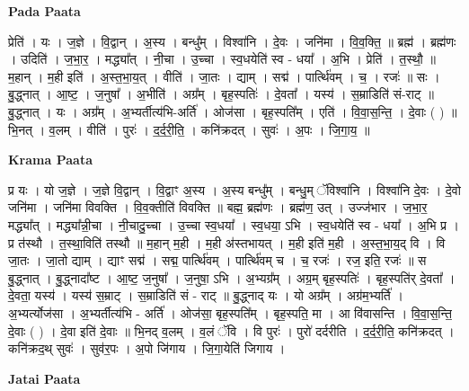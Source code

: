 \documentclass[17pt]{extarticle}
\begin{document}
\textbf{Pada Paata} \newline

प्रेति॑ । यः । ज॒ज्ञे । वि॒द्वान् । अ॒स्य । बन्धु᳚म् । विश्वा॑नि । दे॒वः । जनि॑मा । वि॒व॒क्ति॒ ॥ ब्रह्म॑ । ब्रह्म॑णः । उदिति॑ । ज॒भा॒र॒ । मद्ध्या᳚त् । नी॒चा । उ॒च्चा । स्व॒धयेति॑ स्व - धया᳚ । अ॒भि । प्रेति॑ । त॒स्थौ॒ ॥ म॒हान् । म॒ही इति॑ । अ॒स्त॒भा॒य॒त् । वीति॑ । जा॒तः । द्याम् । सद्म॑ । पार्त्थि॑वम् । च॒ । रजः॑ ॥ सः । बु॒द्ध्नात् । आ॒ष्ट॒ । ज॒नुषा᳚ । अ॒भीति॑ । अग्र᳚म् । बृह॒स्पतिः॑ । दे॒वता᳚ । यस्य॑ । स॒म्राडिति॑ सं-राट् ॥ बु॒द्ध्नात् । यः । अग्र᳚म् । अ॒भ्यर्तीत्य॑भि-अर्ति॑ । ओज॑सा । बृह॒स्पति᳚म् । एति॑ । वि॒वा॒स॒न्ति॒ । दे॒वाः ( ) ॥ भि॒नत् । व॒लम् । वीति॑ । पुरः॑ । द॒र्द॒री॒ति॒ । कनि॑क्रदत् । सुवः॑ । अ॒पः । जि॒गा॒य॒ ॥  \newline


\textbf{Krama Paata} \newline

प्र यः । यो ज॒ज्ञे । ज॒ज्ञे वि॒द्वान् । वि॒द्वाꣳ अ॒स्य । अ॒स्य बन्धु᳚म् । बन्धु॒म् ॅविश्वा॑नि । विश्वा॑नि दे॒वः । दे॒वो जनि॑मा । जनि॑मा विवक्ति । वि॒व॒क्तीति॑ विवक्ति ॥ बह्म॒ ब्रह्म॑णः । ब्रह्म॑ण॒ उत् । उज्ज॑भार । ज॒भा॒र॒ मद्ध्या᳚त् । मद्ध्या᳚न्नी॒चा । नी॒चादु॒च्चा । उ॒च्चा स्व॒धया᳚ । स्व॒धया॒ ऽभि । स्व॒धयेति॑ स्व - धया᳚ । अ॒भि प्र । प्र त॑स्थौ । त॒स्था॒विति॑ तस्थौ ॥ म॒हान् म॒ही । म॒ही अ॑स्तभायत् । म॒ही इति॑ म॒ही । अ॒स्त॒भा॒य॒द् वि । वि जा॒तः । जा॒तो द्याम् । द्याꣳ सद्म॑ । सद्म॒ पार्त्थि॑वम् । पार्त्थि॑वम् च । च॒ रजः॑ । रज॒ इति॒ रजः॑ ॥ स बु॒द्ध्नात् । बु॒द्ध्नादा᳚ष्ट । आ॒ष्ट॒ ज॒नुषा᳚ । ज॒नुषा॒ ऽभि । अ॒भ्यग्र᳚म् । अग्र॒म् बृह॒स्पतिः॑ । बृह॒स्पति॑र् दे॒वता᳚ । दे॒वता॒ यस्य॑ । यस्य॑ स॒म्राट् । स॒म्राडिति॑ सं - राट् ॥ बु॒द्ध्नाद् यः । यो अग्र᳚म् । अग्र॑म॒भ्यर्ति॑ । अ॒भ्यर्त्योज॑सा । अ॒भ्यर्तीत्य॑भि - अर्ति॑ । ओज॑सा॒ बृह॒स्पति᳚म् । बृह॒स्पति॒ मा । आ वि॑वासन्ति । वि॒वा॒स॒न्ति॒ दे॒वाः ( ) । दे॒वा इति॑ दे॒वाः ॥ भि॒नद् व॒लम् । व॒लं ॅवि । वि पुरः॑ । पुरो॑ दर्दरीति । द॒र्द॒री॒ति॒ कनि॑क्रदत् । कनि॑क्रद॒थ् सुवः॑ । सुव॑र॒पः । अ॒पो जि॑गाय । जि॒गा॒येति॑ जिगाय । \newline

\textbf{Jatai Paata} \newline
\end{document}
